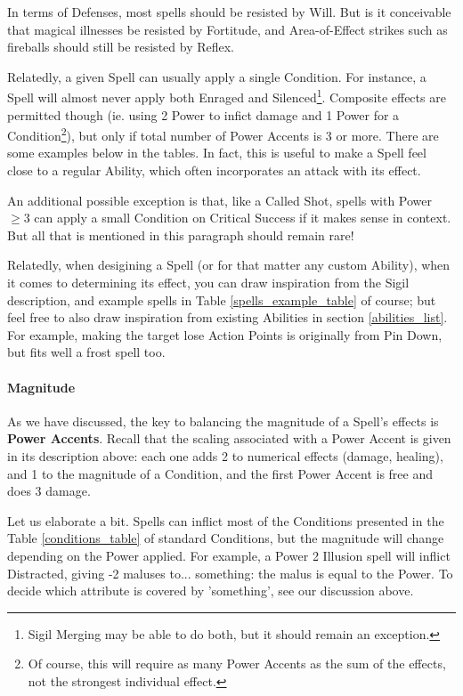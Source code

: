 In terms of Defenses, most spells should be resisted by Will. But is it conceivable that magical illnesses be resisted by Fortitude, and Area-of-Effect strikes such as fireballs should still be resisted by Reflex.

Relatedly, a given Spell can usually apply a single Condition. For instance, a Spell will almost never apply both Enraged and Silenced\footnote{Sigil Merging may be able to do both, but it should remain an exception.}. Composite effects are permitted though (ie. using 2 Power to infict damage and 1 Power for a Condition\footnote{Of course, this will require as many Power Accents as the sum of the effects, not the strongest individual effect.}), but only if total number of Power Accents is 3 or more. There are some examples below in the tables. In fact, this is useful to make a Spell feel close to a regular Ability, which often incorporates an attack with its effect.

An additional possible exception is that, like a Called Shot, spells with Power $\geq 3$ can apply a small Condition on Critical Success if it makes sense in context. But all that is mentioned in this paragraph should remain rare!

Relatedly, when desigining a Spell (or for that matter any custom Ability), when it comes to determining its effect, you can draw inspiration from the Sigil description, and example spells in Table \ref{spells_example_table} of course; but feel free to also draw inspiration from existing Abilities in section \ref{abilities_list}. For example, making the target lose Action Points is originally from Pin Down, but fits well a frost spell too.






\paragraph{Magnitude}

As we have discussed, the key to balancing the magnitude of a Spell's effects is \textbf{Power Accents}. Recall that the scaling associated with a Power Accent is given in its description above: each one adds 2 to numerical effects (damage, healing), and 1 to the magnitude of a Condition, and the first Power Accent is free and does 3 damage.

Let us elaborate a bit. Spells can inflict most of the Conditions presented in the Table \ref{conditions_table} of standard Conditions, but the magnitude will change depending on the Power applied. For example, a Power 2 Illusion spell will inflict Distracted, giving -2 maluses to... something: the malus is equal to the Power. To decide which attribute is covered by 'something', see our discussion above.

